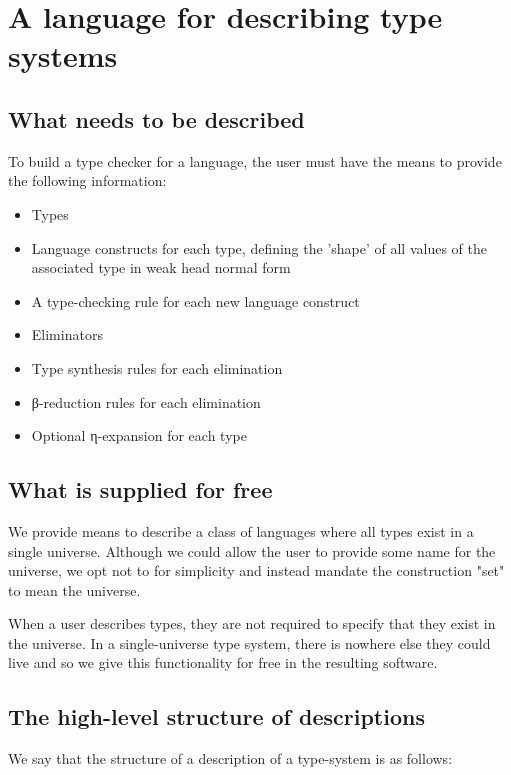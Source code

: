 \chapter{A language for describing type systems}
\label{chapter-DSL}


\section{What needs to be described}

To build a type checker for a language, the user must have
the means to provide the following information:

\begin{itemize}
  \item Types
  \item Language constructs for each type, defining the 'shape' of
    all values of the associated type in weak head normal form
  \item A type-checking rule for each new language construct
  \item Eliminators
  \item Type synthesis rules for each elimination
  \item β-reduction rules for each elimination
  \item Optional η-expansion for each type
\end{itemize}

\section{What is supplied for free}

We provide means to describe a class of languages where all types
exist in a single universe. Although we could allow the user to
provide some name for the universe, we opt not to for simplicity and
instead mandate the construction "set" to mean the universe.

When a user describes types, they are not required to specify that
they exist in the universe. In a single-universe type system, there
is nowhere else they could live and so we give this
functionality for free in the resulting software.

\section{The high-level structure of descriptions}

We say that the structure of a description of a type-system is as
follows: 

